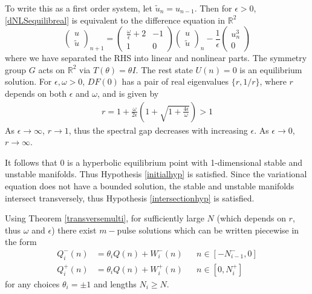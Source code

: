 \documentclass[12pt]{article}
\def\R{{\mathbb R}}
\begin{document}
To write this as a first order system, let $\tilde{u}_n = u_{n-1}$. Then for $\epsilon > 0$, \eqref{dNLSequilibreal} is equivalent to the difference equation in $\R^2$
\begin{equation}\label{dnlsdiffR2}
\begin{pmatrix}
u \\ \tilde{u}
\end{pmatrix}_{n+1} =
\begin{pmatrix}
\frac{\omega}{\epsilon} + 2 & -1 \\
1 & 0
\end{pmatrix}
\begin{pmatrix}
u \\ \tilde{u}
\end{pmatrix}_n
- \frac{1}{\epsilon} 
\begin{pmatrix}
u_n^3 \\ 0
\end{pmatrix}
\end{equation}
where we have separated the RHS into linear and nonlinear parts. The symmetry group $G$ acts on $\R^2$ via $T(\theta) = \theta I$. The rest state $U(n) = 0$ is an equilibrium solution. For $\epsilon, \omega > 0$, $DF(0)$ has a pair of real eigenvalues $\{r, 1/r \}$, where $r$ depends on both $\epsilon$ and $\omega$, and is given by
\begin{align}\label{defr}
r = 1 + \frac{\omega}{2 \epsilon} \left( 1 + \sqrt{1 + \frac{4 \epsilon}{\omega}} \right) > 1
\end{align}
As $\epsilon \rightarrow \infty$, $r \rightarrow 1$, thus the spectral gap decreases with increasing $\epsilon$. As $\epsilon \rightarrow 0$, $r \rightarrow \infty$.

It follows that 0 is a hyperbolic equilibrium point with 1-dimensional stable and unstable manifolds. Thus Hypothesis \ref{initialhyp} is satisfied. Since the variational equation does not have a bounded solution, the stable and unstable manifolds intersect transversely, thus Hypothesis \ref{intersectionhyp} is satisfied. 

Using Theorem \ref{transversemulti}, for sufficiently large $N$ (which depends on $r$, thus $\omega$ and $\epsilon$) there exist $m-$pulse solutions which can be written piecewise in the form
\begin{align*}
Q_i^-(n) &= \theta_i Q(n) + W_i^-(n) && n \in [-N_{i-1}^-, 0] \\
Q_i^+(n) &= \theta_i Q(n) + W_i^+(n) && n \in [0, N_i^+]
\end{align*}
for any choices $\theta_i = \pm 1$ and lengths $N_i \geq N$. 
\end{document}
